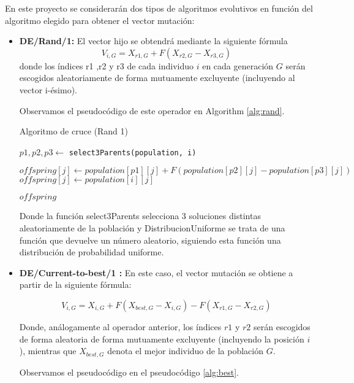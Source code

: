 	En este proyecto se considerarán dos tipos de algoritmos evolutivos en función del algoritmo elegido para obtener el vector mutación:
		\begin{itemize}
		\item \textbf{DE/Rand/1: } El vector hijo se obtendrá mediante la siguiente fórmula
		\[
		V_{i,G} = X_{r1,G} + F (X_{r2,G} - X_{r3,G})
		\]
		donde los índices r1 ,r2 y r3 de cada individuo $i$ en cada generación $G$ serán escogidos aleatoriamente de forma mutuamente excluyente (incluyendo al vector i-ésimo).
		
		Observamos el pseudocódigo de este operador en Algorithm \ref{alg:rand}.
		
		\begin{algorithm}[H]
			\caption{Algoritmo de cruce (Rand 1)}
			\label{alg:rand}
			\begin{algorithmic}[1]
				
				\State $p1,p2,p3 \gets $ \texttt{select3Parents(population, i)} 
				
				\State $offspring[j] \gets population[p1][j] + F (population[p2][j] - population[p3][j]) $
				\Else
				\State $offspring[j] \gets population[i][j]$
				\EndIf
				
				
				\EndFor
				
				
				\Return $offspring$
				
				\EndProcedure
			\end{algorithmic}
		\end{algorithm}
		Donde la función select3Parents selecciona 3 soluciones distintas aleatoriamente de la población y DistribucionUniforme se trata de una función que devuelve un número aleatorio, siguiendo esta función una distribución de probabilidad uniforme.
		
		\item \textbf{DE/Current-to-best/1 :} En este caso, el vector mutación se obtiene a partir de la siguiente fórmula:
		
		\[
		V_{i,G} = X_{i,G} + F(X_{best,G} - X_{i,G}) - F(X_{r1,G} - X_{r2,G})
		\]
		
		Donde, análogamente al operador anterior, los índices $r1$ y $r2$ serán escogidos de forma aleatoria de forma mutuamente excluyente (incluyendo la posición $i$), mientras que $X_{best,G}$ denota el mejor individuo de la población $G$.
		
		Observamos el pseudocódigo en el pseudocódigo \ref{alg:best}.
		

\end{itemize}
